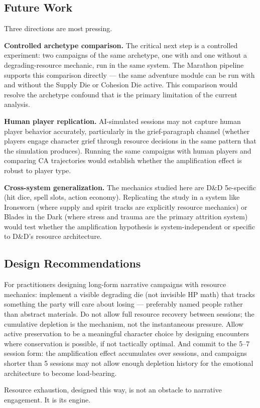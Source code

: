 \subsection{Future Work}

Three directions are most pressing.

\textbf{Controlled archetype comparison.} The critical next step is a controlled
experiment: two campaigns of the same archetype, one with and one without a degrading-resource
mechanic, run in the same system. The Marathon pipeline supports this comparison
directly --- the same adventure module can be run with and without the Supply Die
or Cohesion Die active. This comparison would resolve the archetype confound that
is the primary limitation of the current analysis.

\textbf{Human player replication.} AI-simulated sessions may not capture human
player behavior accurately, particularly in the grief-paragraph channel (whether
players engage character grief through resource decisions in the same pattern that
the simulation produces). Running the same campaigns with human players and comparing
CA trajectories would establish whether the amplification effect is robust to player
type.

\textbf{Cross-system generalization.} The mechanics studied here are D\&D 5e-specific
(hit dice, spell slots, action economy). Replicating the study in a system like
Ironsworn (where supply and spirit tracks are explicitly resource mechanics) or
Blades in the Dark (where stress and trauma are the primary attrition system) would
test whether the amplification hypothesis is system-independent or specific to D\&D's
resource architecture.

\subsection{Design Recommendations}

For practitioners designing long-form narrative campaigns with resource mechanics:
implement a visible degrading die (not invisible HP math) that tracks something the
party will care about losing --- preferably named people rather than abstract
materials. Do not allow full resource recovery between sessions; the cumulative
depletion is the mechanism, not the instantaneous pressure. Allow active preservation
to be a meaningful character choice by designing encounters where conservation is
possible, if not tactically optimal. And commit to the 5--7 session form: the
amplification effect accumulates over sessions, and campaigns shorter than 5 sessions
may not allow enough depletion history for the emotional architecture to become load-bearing.

Resource exhaustion, designed this way, is not an obstacle to narrative engagement.
It is its engine.
